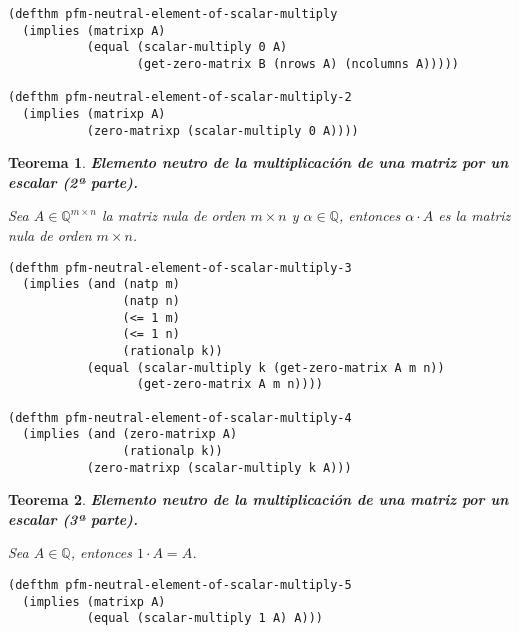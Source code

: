 \documentclass[a4paper,10pt]{article}
\newcommand{\Q}[1]{#1 \in \mathbb{Q}}
\newcommand{\M}[3]{#1 \in \mathbb{Q}^{#2 \times #3}}
\newtheorem{teor}{{Teorema}}
\begin{document}
\begin{lstlisting}[language=clips]
(defthm pfm-neutral-element-of-scalar-multiply
  (implies (matrixp A)
           (equal (scalar-multiply 0 A) 
                  (get-zero-matrix B (nrows A) (ncolumns A)))))
									
(defthm pfm-neutral-element-of-scalar-multiply-2
  (implies (matrixp A)
           (zero-matrixp (scalar-multiply 0 A))))
\end{lstlisting}

\par \vspace{16pt}

\begin{teor} \textbf{Elemento neutro de la multiplicación de una matriz por un escalar (2ª parte).}\vspace{8pt}\par
Sea $\M{A}{m}{n}$ la matriz nula de orden $m \times n$ y $\Q{\alpha}$, entonces $\alpha\cdot A$ es la matriz nula de orden $m \times n$.
\end{teor}

\begin{lstlisting}[language=clips]
(defthm pfm-neutral-element-of-scalar-multiply-3
  (implies (and (natp m)
                (natp n)
                (<= 1 m)
                (<= 1 n)
                (rationalp k))
           (equal (scalar-multiply k (get-zero-matrix A m n))
                  (get-zero-matrix A m n))))
									
(defthm pfm-neutral-element-of-scalar-multiply-4
  (implies (and (zero-matrixp A)
                (rationalp k))
           (zero-matrixp (scalar-multiply k A)))
\end{lstlisting}

\par \vspace{16pt}

\begin{teor} \textbf{Elemento neutro de la multiplicación de una matriz por un escalar (3ª parte).}\vspace{8pt}\par
Sea $\Q{A}$, entonces $1\cdot A = A$.
\end{teor}

\begin{lstlisting}[language=clips]
(defthm pfm-neutral-element-of-scalar-multiply-5
  (implies (matrixp A)
           (equal (scalar-multiply 1 A) A)))
\end{lstlisting}

\par \vspace{16pt}
\end{document}
